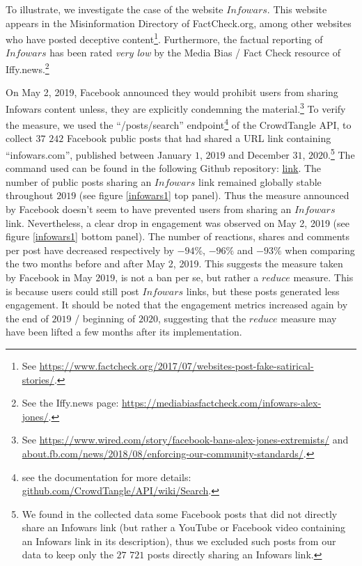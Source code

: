 \documentclass{article}
\begin{document}
\smallskip

To illustrate, we investigate the case of the website $Infowars$. This website appears in the Misinformation Directory of FactCheck.org, among other websites who have posted deceptive content\footnote{See \href{https://www.factcheck.org/2017/07/websites-post-fake-satirical-stories/}{https://www.factcheck.org/2017/07/websites-post-fake-satirical-stories/}.}. Furthermore, the factual reporting of $Infowars$ has been rated {\it very low} by the Media Bias / Fact Check resource of Iffy.news.\footnote{See the Iffy.news page: \href{https://mediabiasfactcheck.com/infowars-alex-jones/}{https://mediabiasfactcheck.com/infowars-alex-jones/}.} 

\smallskip

On May 2, 2019, Facebook announced they would prohibit users from sharing Infowars content unless, they are explicitly condemning the material.\footnote{See \href{https://www.wired.com/story/facebook-bans-alex-jones-extremists/}{https://www.wired.com/story/facebook-bans-alex-jones-extremists/} and \href{https://about.fb.com/news/2018/08/enforcing-our-community-standards/}{about.fb.com/news/2018/08/enforcing-our-community-standards/}.} To verify the measure, we used the ``/posts/search'' endpoint\footnote{see the documentation for more details: \href{https://github.com/CrowdTangle/API/wiki/Search}{github.com/CrowdTangle/API/wiki/Search}.} of the CrowdTangle API, to collect $37$ $242$ Facebook public posts that had shared a URL link containing ``infowars.com'', published between January $1$, $2019$ and December $31$, $2020$.\footnote{We found in the collected data some Facebook posts that did not directly share an Infowars link (but rather a YouTube or Facebook video containing an Infowars link in its description), thus we excluded such posts from our data to keep only the $27$ $721$ posts directly sharing an Infowars link.} The command used can be found in the following Github repository: \href{https://github.com/medialab/truth-and-trust-online-2021/blob/master/code/collect_facebook_crowdtangle_infowars_data.sh}{link}. The number of public posts sharing an $Infowars$ link remained globally stable throughout $2019$ (see figure \ref{infowars1} top panel). Thus the measure announced by Facebook doesn't seem to have prevented users from sharing an $Infowars$ link. Nevertheless, a clear drop in engagement was observed on May 2, 2019 (see figure \ref{infowars1} bottom panel). The number of reactions, shares and comments per post have decreased respectively  by $-94\%$,  $-96\%$ and $-93\%$  when comparing the two months before and after May 2, 2019. This suggests the measure taken by Facebook in May $2019$, is not a ban per se, but rather a $reduce$ measure. This is because users could still post $Infowars$ links, but these posts generated less engagement. It should be noted that the engagement metrics increased again by the end of $2019$ / beginning of $2020$, suggesting that the $reduce$ measure may have been lifted a few months after its implementation.
\end{document}
